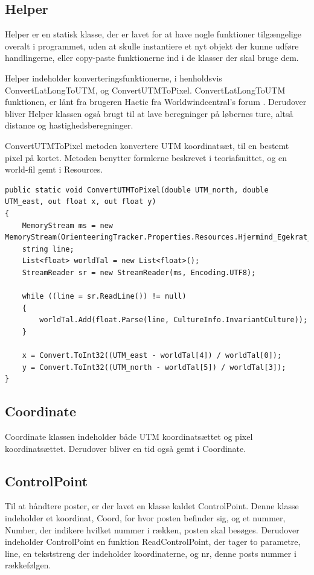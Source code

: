 \subsection{Helper}
Helper er en statisk klasse, der er lavet for at have nogle funktioner tilgængelige overalt i programmet, uden at skulle instantiere et nyt objekt der kunne udføre handlingerne, eller copy-paste funktionerne ind i de klasser der skal bruge dem. 

Helper indeholder konverteringsfunktionerne, i henholdsvis ConvertLatLongToUTM, og ConvertUTMToPixel. ConvertLatLongToUTM funktionen, er lånt fra brugeren Hactic fra Worldwindcentral's forum \citep{UTM}.
Derudover bliver Helper klassen også brugt til at lave beregninger på løbernes ture, altså distance og hastighedsberegninger.
 
ConvertUTMToPixel metoden konvertere UTM koordinatsæt, til en bestemt pixel på kortet. Metoden benytter formlerne beskrevet i teoriafsnittet, og en world-fil gemt i Resources.

\begin{lstlisting}
public static void ConvertUTMToPixel(double UTM_north, double UTM_east, out float x, out float y)
{
    MemoryStream ms = new MemoryStream(OrienteeringTracker.Properties.Resources.Hjermind_Egekrat_ref_ref1);
    string line;
    List<float> worldTal = new List<float>();
    StreamReader sr = new StreamReader(ms, Encoding.UTF8);

    while ((line = sr.ReadLine()) != null)
    {
        worldTal.Add(float.Parse(line, CultureInfo.InvariantCulture));
    }

    x = Convert.ToInt32((UTM_east - worldTal[4]) / worldTal[0]);
    y = Convert.ToInt32((UTM_north - worldTal[5]) / worldTal[3]);
}
\end{lstlisting}

\subsection{Coordinate}
Coordinate klassen indeholder både UTM koordinatsættet og pixel koordinatsættet. Derudover bliver en tid også gemt i Coordinate.

\subsection{ControlPoint}
Til at håndtere poster, er der lavet en klasse kaldet ControlPoint. Denne klasse indeholder et koordinat, Coord, for hvor posten befinder sig, og et nummer, Number, der indikere hvilket nummer i rækken, posten skal besøges. 
Derudover indeholder ControlPoint en funktion ReadControlPoint, der tager to parametre, line, en tekststreng der indeholder koordinaterne, og nr, denne posts nummer i rækkefølgen. 


